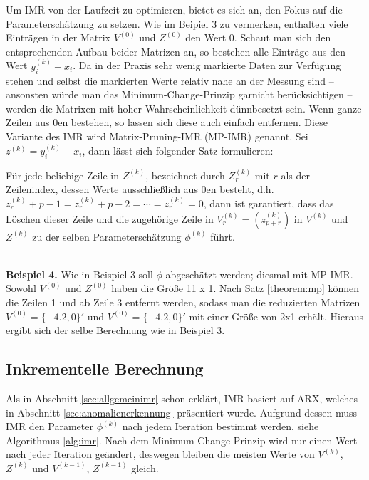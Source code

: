 Um IMR von der Laufzeit zu optimieren, bietet es sich an, den Fokus auf die
Parameterschätzung zu setzen. Wie im Beipiel 3 zu vermerken, enthalten viele
Einträgen in der Matrix $V^{(0)}$ und $Z^{(0)}$ den Wert 0. Schaut man sich den
entsprechenden Aufbau beider Matrizen an, so bestehen alle Einträge aus den
Wert $y^{(k)}_i - x_i$. Da in der Praxis sehr wenig markierte Daten zur
Verfügung stehen und selbst die markierten Werte relativ nahe an der Messung
sind -- ansonsten würde man das Minimum-Change-Prinzip garnicht berücksichtigen
-- werden die Matrixen mit hoher Wahrscheinlichkeit dünnbesetzt sein. Wenn
ganze Zeilen aus 0en bestehen, so lassen sich diese auch einfach entfernen.
Diese Variante des IMR wird Matrix-Pruning-IMR (MP-IMR) genannt. Sei $z^{(k)} =
y^{(k)}_i - x_i$, dann lässt sich folgender Satz formulieren:
\begin{theorem}
    Für jede beliebige Zeile in $Z^{(k)}$, bezeichnet durch $Z^{(k)}_r$ mit $r$
    als der Zeilenindex, dessen Werte ausschließlich aus 0en besteht, d.h.
    $z^{(k)}_r+p-1 = z^{(k)}_r+p-2 = \cdots = z_r^{(k)} = 0$,  dann ist
    garantiert, dass das Löschen dieser Zeile und die zugehörige Zeile in
    $V_r^{(k)} = \left(z^{(k)}_{p+r}\right)$ in $V^{(k)}$ und $Z^{(k)}$ zu der
    selben Parameterschätzung $\phi^{(k)}$ führt.
    \label{theorem:mp}
\end{theorem}
~\\
\textbf{Beispiel 4.} Wie in Beispiel 3 soll $\phi$ abgeschätzt werden; diesmal
mit MP-IMR.  Sowohl $V^{(0)}$ und $Z^{(0)}$ haben die Größe 11 x 1. Nach Satz
\ref{theorem:mp} können die Zeilen 1 und ab Zeile 3 entfernt werden, sodass man
die reduzierten Matrizen $V^{(0)} = \{-4.2, 0\}'$ und $V^{(0)} = \{-4.2, 0\}'$
mit einer Größe von 2x1 erhält. Hieraus ergibt sich der selbe Berechnung wie in
Beispiel 3.
\subsection{Inkrementelle Berechnung}
Als in Abschnitt \ref{sec:allgemeinimr} schon erklärt, IMR basiert auf ARX,
welches in Abschnitt \ref{sec:anomalienerkennung} präsentiert wurde. Aufgrund
dessen muss IMR den Parameter $\phi^{(k)}$ nach jedem Iteration bestimmt
werden, siehe Algorithmus \ref{alg:imr}. Nach dem Minimum-Change-Prinzip wird nur
einen Wert nach jeder Iteration geändert, deswegen bleiben die meisten Werte von 
$V^{(k)}$, $Z^{(k)}$ und $V^{(k-1)}$, $Z^{(k-1)}$ gleich. 
